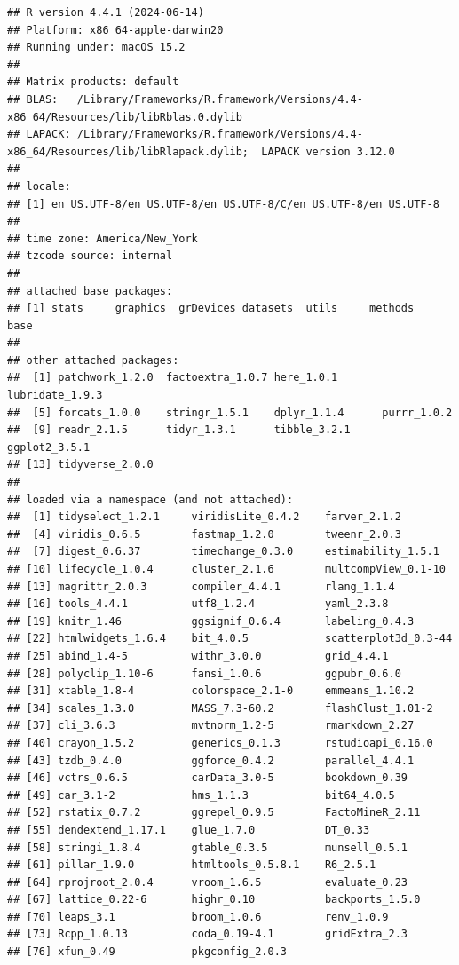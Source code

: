 \documentclass[
]{book}
\begin{document}
\begin{verbatim}
## R version 4.4.1 (2024-06-14)
## Platform: x86_64-apple-darwin20
## Running under: macOS 15.2
## 
## Matrix products: default
## BLAS:   /Library/Frameworks/R.framework/Versions/4.4-x86_64/Resources/lib/libRblas.0.dylib 
## LAPACK: /Library/Frameworks/R.framework/Versions/4.4-x86_64/Resources/lib/libRlapack.dylib;  LAPACK version 3.12.0
## 
## locale:
## [1] en_US.UTF-8/en_US.UTF-8/en_US.UTF-8/C/en_US.UTF-8/en_US.UTF-8
## 
## time zone: America/New_York
## tzcode source: internal
## 
## attached base packages:
## [1] stats     graphics  grDevices datasets  utils     methods   base     
## 
## other attached packages:
##  [1] patchwork_1.2.0  factoextra_1.0.7 here_1.0.1       lubridate_1.9.3 
##  [5] forcats_1.0.0    stringr_1.5.1    dplyr_1.1.4      purrr_1.0.2     
##  [9] readr_2.1.5      tidyr_1.3.1      tibble_3.2.1     ggplot2_3.5.1   
## [13] tidyverse_2.0.0 
## 
## loaded via a namespace (and not attached):
##  [1] tidyselect_1.2.1     viridisLite_0.4.2    farver_2.1.2        
##  [4] viridis_0.6.5        fastmap_1.2.0        tweenr_2.0.3        
##  [7] digest_0.6.37        timechange_0.3.0     estimability_1.5.1  
## [10] lifecycle_1.0.4      cluster_2.1.6        multcompView_0.1-10 
## [13] magrittr_2.0.3       compiler_4.4.1       rlang_1.1.4         
## [16] tools_4.4.1          utf8_1.2.4           yaml_2.3.8          
## [19] knitr_1.46           ggsignif_0.6.4       labeling_0.4.3      
## [22] htmlwidgets_1.6.4    bit_4.0.5            scatterplot3d_0.3-44
## [25] abind_1.4-5          withr_3.0.0          grid_4.4.1          
## [28] polyclip_1.10-6      fansi_1.0.6          ggpubr_0.6.0        
## [31] xtable_1.8-4         colorspace_2.1-0     emmeans_1.10.2      
## [34] scales_1.3.0         MASS_7.3-60.2        flashClust_1.01-2   
## [37] cli_3.6.3            mvtnorm_1.2-5        rmarkdown_2.27      
## [40] crayon_1.5.2         generics_0.1.3       rstudioapi_0.16.0   
## [43] tzdb_0.4.0           ggforce_0.4.2        parallel_4.4.1      
## [46] vctrs_0.6.5          carData_3.0-5        bookdown_0.39       
## [49] car_3.1-2            hms_1.1.3            bit64_4.0.5         
## [52] rstatix_0.7.2        ggrepel_0.9.5        FactoMineR_2.11     
## [55] dendextend_1.17.1    glue_1.7.0           DT_0.33             
## [58] stringi_1.8.4        gtable_0.3.5         munsell_0.5.1       
## [61] pillar_1.9.0         htmltools_0.5.8.1    R6_2.5.1            
## [64] rprojroot_2.0.4      vroom_1.6.5          evaluate_0.23       
## [67] lattice_0.22-6       highr_0.10           backports_1.5.0     
## [70] leaps_3.1            broom_1.0.6          renv_1.0.9          
## [73] Rcpp_1.0.13          coda_0.19-4.1        gridExtra_2.3       
## [76] xfun_0.49            pkgconfig_2.0.3
\end{verbatim}
\end{document}
